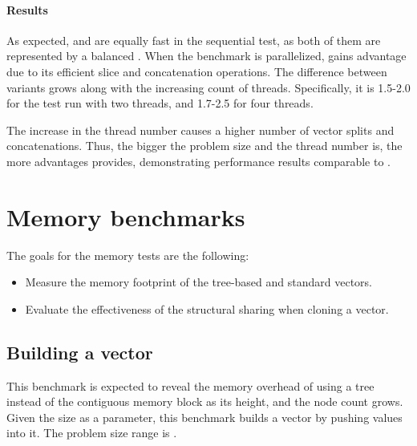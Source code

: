 \paragraph{Results}
As expected, \rbvec{} and \rrbvec{} are equally fast in the sequential test, as both of them are represented by a balanced \rbtree{}. When the benchmark is parallelized, \rrbvec{} gains advantage due to its efficient slice and concatenation operations. The difference between variants grows along with the increasing count of threads. Specifically, it is 1.5-2.0 for the test run with two threads, and 1.7-2.5 for four threads.

The increase in the thread number causes a higher number of vector splits and concatenations. Thus, the bigger the problem size and the thread number is, the more advantages \rrbvec{} provides, demonstrating performance results comparable to \stdvec{}.

\section{Memory benchmarks}
The goals for the memory tests are the following:
\begin{itemize}
    \item Measure the memory footprint of the tree-based and standard vectors.
    \item Evaluate the effectiveness of the structural sharing when cloning a vector.
\end{itemize}

\subsection{Building a vector}
This benchmark is expected to reveal the memory overhead of using a tree instead of the contiguous memory block as its height, and the node count grows. Given the size \n{} as a parameter, this benchmark builds a vector by pushing \n{} values into it. The problem size range is .

